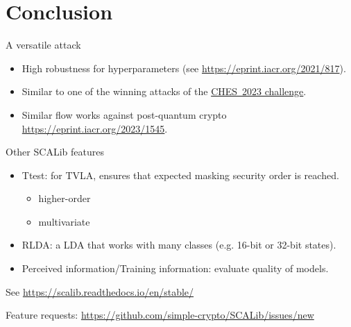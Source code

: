 \documentclass[aspectratio=169]{beamer}
\begin{document}
\section{Conclusion}
\begin{frame}{A versatile attack}
    \begin{itemize}
        \item High robustness for hyperparameters (see \url{https://eprint.iacr.org/2021/817}).
        \item Similar to one of the winning attacks of the \href{https://ches.iacr.org/2023/challenge.php}{CHES~2023 challenge}.
        \item Similar flow works against post-quantum crypto \url{https://eprint.iacr.org/2023/1545}.
    \end{itemize}
\end{frame}

\begin{frame}{Other SCALib features}
    \begin{itemize}
        \item Ttest: for TVLA, ensures that expected masking security order is reached.
            \begin{itemize}
                    \item higher-order
                    \item multivariate
            \end{itemize}
        \item RLDA: a LDA that works with many classes (e.g. 16-bit or 32-bit states).
        \item Perceived information/Training information: evaluate quality of models.
    \end{itemize}

    See \url{https://scalib.readthedocs.io/en/stable/}

    Feature requests: \url{https://github.com/simple-crypto/SCALib/issues/new}
\end{frame}
\end{document}
